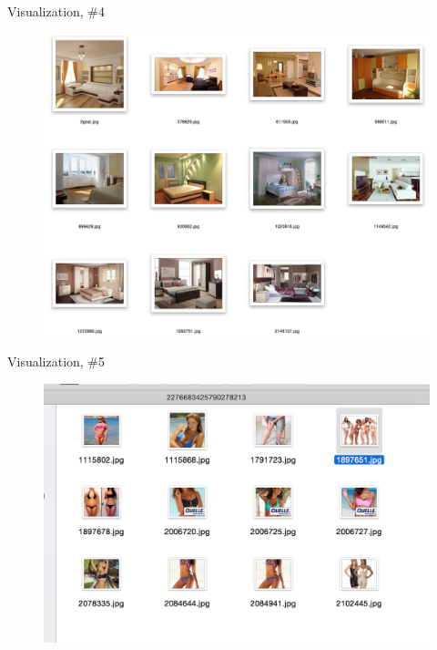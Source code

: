 \documentclass{beamer}
\begin{document}
\begin{frame}{Visualization, \#4}

\begin{figure}[h!]
  \centering
  \includegraphics[width=1\textwidth]{images/search4.png}
\end{figure}

\end{frame}


\begin{frame}{Visualization, \#5}

\begin{figure}[h!]
  \centering
  \includegraphics[width=1\textwidth]{images/search5.png}
\end{figure}

\end{frame}
\end{document}
